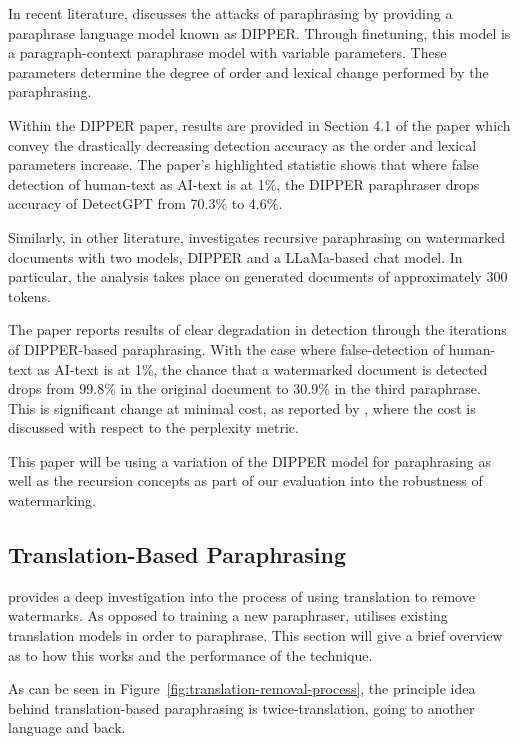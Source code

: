 \documentclass{l4proj}
\theoremstyle{definition}
\begin{document}
        In recent literature, \citet{krishna2023paraphrasing} discusses the attacks of paraphrasing by providing a paraphrase language model known as DIPPER. Through finetuning, this model is a paragraph-context paraphrase model with variable parameters. These parameters determine the degree of order and lexical change performed by the paraphrasing. 

        Within the DIPPER paper, results are provided in Section 4.1 of the paper which convey the drastically decreasing detection accuracy as the order and lexical parameters increase.
        The paper's highlighted statistic shows that where false detection of human-text as AI-text is at 1\%, the DIPPER paraphraser drops accuracy of DetectGPT from 70.3\% to 4.6\%.

        Similarly, in other literature, \citet{sadasivan2023aigenerated} investigates recursive paraphrasing on watermarked documents with two models, DIPPER and a LLaMa-based chat model. In particular, the analysis takes place on generated documents of approximately 300 tokens. 

        The paper reports results of clear degradation in detection through the iterations of DIPPER-based paraphrasing. With the case where false-detection of human-text as AI-text is at 1\%, the chance that a watermarked document is detected drops from 99.8\% in the original document to 30.9\% in the third paraphrase. This is significant change at minimal cost, as reported by \citet{sadasivan2023aigenerated}, where the cost is discussed with respect to the perplexity metric.

        This paper will be using a variation of the DIPPER model for paraphrasing as well as the recursion concepts as part of our evaluation into the robustness of watermarking. 

    \subsection{Translation-Based Paraphrasing}
        \citet{he2024watermarks} provides a deep investigation into the process of using translation to remove watermarks. As opposed to training a new paraphraser, \citet{he2024watermarks} utilises existing translation models in order to paraphrase. This section will give a brief overview as to how this works and the performance of the technique. 

        As can be seen in Figure~\ref{fig:translation-removal-process}, the principle idea behind translation-based paraphrasing is twice-translation, going to another language and back. 
\end{document}

